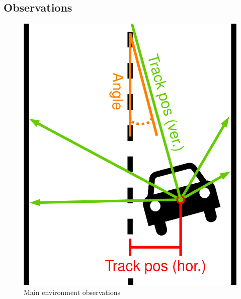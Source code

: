 \subsection{Observations}
\label{sec:observations}

\begin{figure}[ht]
    \includegraphics[width=0.3\linewidth]{figures/Observations.jpg}
    \centering
    \caption{Main environment observations}
    \label{fig:observations}
\end{figure}


